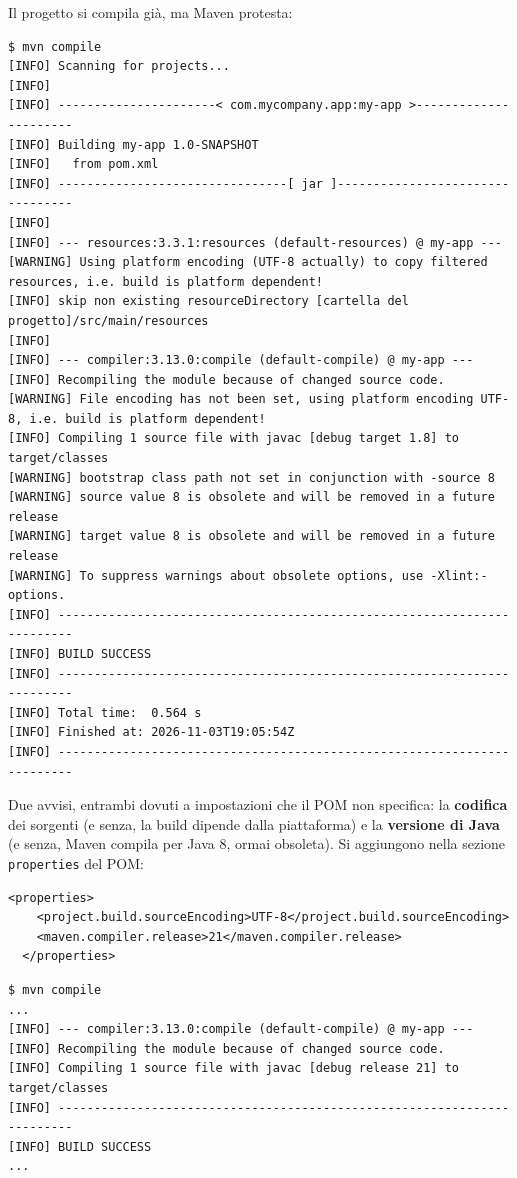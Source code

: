 Il progetto si compila già, ma Maven protesta:

\begin{lstlisting}[style=shell, name=Terminale]
$ mvn compile
[INFO] Scanning for projects...
[INFO]
[INFO] ----------------------< com.mycompany.app:my-app >----------------------
[INFO] Building my-app 1.0-SNAPSHOT
[INFO]   from pom.xml
[INFO] --------------------------------[ jar ]---------------------------------
[INFO]
[INFO] --- resources:3.3.1:resources (default-resources) @ my-app ---
[WARNING] Using platform encoding (UTF-8 actually) to copy filtered resources, i.e. build is platform dependent!
[INFO] skip non existing resourceDirectory [cartella del progetto]/src/main/resources
[INFO]
[INFO] --- compiler:3.13.0:compile (default-compile) @ my-app ---
[INFO] Recompiling the module because of changed source code.
[WARNING] File encoding has not been set, using platform encoding UTF-8, i.e. build is platform dependent!
[INFO] Compiling 1 source file with javac [debug target 1.8] to target/classes
[WARNING] bootstrap class path not set in conjunction with -source 8
[WARNING] source value 8 is obsolete and will be removed in a future release
[WARNING] target value 8 is obsolete and will be removed in a future release
[WARNING] To suppress warnings about obsolete options, use -Xlint:-options.
[INFO] ------------------------------------------------------------------------
[INFO] BUILD SUCCESS
[INFO] ------------------------------------------------------------------------
[INFO] Total time:  0.564 s
[INFO] Finished at: 2026-11-03T19:05:54Z
[INFO] ------------------------------------------------------------------------
\end{lstlisting}

Due avvisi, entrambi dovuti a impostazioni che il POM non specifica: la \textbf{codifica} dei sorgenti (e senza, la
build dipende dalla piattaforma) e la \textbf{versione di Java} (e senza, Maven compila per Java 8, ormai obsoleta). Si
aggiungono nella sezione \texttt{properties} del POM:

\begin{lstlisting}[style=xml, name=pom.xml (aggiunta)]
  <properties>
    <project.build.sourceEncoding>UTF-8</project.build.sourceEncoding>
    <maven.compiler.release>21</maven.compiler.release>
  </properties>
\end{lstlisting}

\begin{lstlisting}[style=shell, name=Terminale]
$ mvn compile
...
[INFO] --- compiler:3.13.0:compile (default-compile) @ my-app ---
[INFO] Recompiling the module because of changed source code.
[INFO] Compiling 1 source file with javac [debug release 21] to target/classes
[INFO] ------------------------------------------------------------------------
[INFO] BUILD SUCCESS
...
\end{lstlisting}

